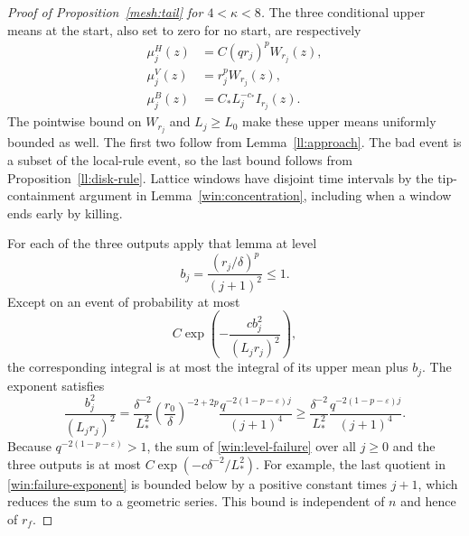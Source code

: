 \documentclass[11pt]{article}
\theoremstyle{definition}
\theoremstyle{remark}
\numberwithin{equation}{section}
\begin{document}
\begin{proof}[Proof of Proposition~\ref{mesh:tail} for $4<\kappa<8$]
The three conditional upper means at the start, also set to zero for
no start, are respectively
\begin{equation}
 \begin{split}
 \mu^H_j(z)&=C(qr_j)^pW_{r_j}(z),\\
 \mu^V_j(z)&=r_j^pW_{r_j}(z),\\
 \mu^B_j(z)&=C_*L_j^{-c_*}I_{r_j}(z).
 \end{split}
 \label{win:means}
\end{equation}
The pointwise bound on $W_{r_j}$ and $L_j\ge L_0$ make these upper
means uniformly bounded as well.
The first two follow from Lemma~\ref{ll:approach}.  The bad event is a
subset of the local-rule event, so the last bound follows from Proposition~\ref{ll:disk-rule}.  Lattice windows have disjoint time intervals by the
tip-containment argument in Lemma~\ref{win:concentration}, including
when a window ends early by killing.

For each of the three outputs apply that lemma at level
\[
 b_j=\frac{(r_j/\delta)^p}{(j+1)^2}\le1.
\]
Except on an event of probability at most
\begin{equation}
 C\exp\left(-\frac{c b_j^2}{(L_jr_j)^2}\right),
 \label{win:level-failure}
\end{equation}
the corresponding integral is at most the integral of its upper mean
plus $b_j$.  The exponent satisfies
\begin{equation}
 \frac{b_j^2}{(L_jr_j)^2}
 =\frac{\delta^{-2}}{L_*^2}
   \left(\frac{r_0}{\delta}\right)^{-2+2p}
   \frac{q^{-2(1-p-\varepsilon)j}}{(j+1)^4}
 \ge \frac{\delta^{-2}}{L_*^2}
   \frac{q^{-2(1-p-\varepsilon)j}}{(j+1)^4}.
 \label{win:failure-exponent}
\end{equation}
Because $q^{-2(1-p-\varepsilon)}>1$, the sum of
\eqref{win:level-failure} over all $j\ge0$ and the three outputs is
at most $C\exp(-c\delta^{-2}/L_*^2)$.  For example, the last quotient in
\eqref{win:failure-exponent} is bounded below by a positive constant
times $j+1$, which reduces the sum to a geometric series.  This bound
is independent of $n$ and hence of $r_f$.


\end{proof}
\end{document}
